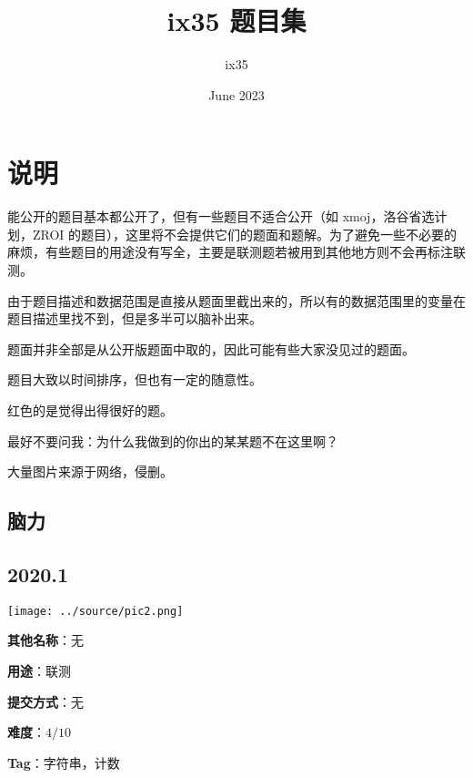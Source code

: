 \documentclass[a4paper,10pt]{article}
\begin{document}
\title{ix35 题目集}
\author{ix35}
\date{June 2023}
\maketitle

\tableofcontents
\newpage
{}

\vspace*{\fill}

{\centering\section*{说明}}

能公开的题目基本都公开了，但有一些题目不适合公开（如 xmoj，洛谷省选计划，ZROI 的题目），这里将不会提供它们的题面和题解。为了避免一些不必要的麻烦，有些题目的用途没有写全，主要是联测题若被用到其他地方则不会再标注联测。

由于题目描述和数据范围是直接从题面里截出来的，所以有的数据范围里的变量在题目描述里找不到，但是多半可以脑补出来。

题面并非全部是从公开版题面中取的，因此可能有些大家没见过的题面。

题目大致以时间排序，但也有一定的随意性。

红色的是觉得出得很好的题。

最好不要问我：为什么我做到的你出的某某题不在这里啊？

大量图片来源于网络，侵删。

\vspace*{\fill}

\newpage

\vspace*{\fill}
\begin{center}

\section{脑力}

\subsection*{2020.1}

\vspace{10pt}

\texttt{[image: ../source/pic2.png]}

\vspace{10pt}

\textbf{其他名称}：无

\vspace{10pt}

\textbf{用途}：联测

\vspace{10pt}

\textbf{提交方式}：无

\vspace{10pt}

\textbf{难度}：$4/10$

\vspace{10pt}

\textbf{Tag}：字符串，计数

\end{center}
\vspace*{\fill}
\end{document}
